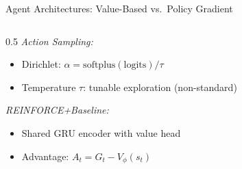 \documentclass[aspectratio=169]{beamer}
\begin{document}
\begin{frame}{Agent Architectures: Value-Based vs.\ Policy Gradient}
\begin{columns}[T,totalwidth=\textwidth]
\begin{column}{0.5\textwidth}
\vspace{0.1em}
\textit{Action Sampling:}
\begin{itemize}\setlength{\itemsep}{1pt}
  \item Dirichlet: $\alpha = \text{softplus}(\text{logits}) / \tau$
  \item Temperature $\tau$: tunable exploration (non-standard)
\end{itemize}

\vspace{0.1em}
\textit{REINFORCE+Baseline:}
\begin{itemize}\setlength{\itemsep}{1pt}
  \item Shared GRU encoder with value head
  \item Advantage: $A_t = G_t - V_\phi(s_t)$
\end{itemize}
\end{column}
\end{columns}

\end{frame}
\end{document}
